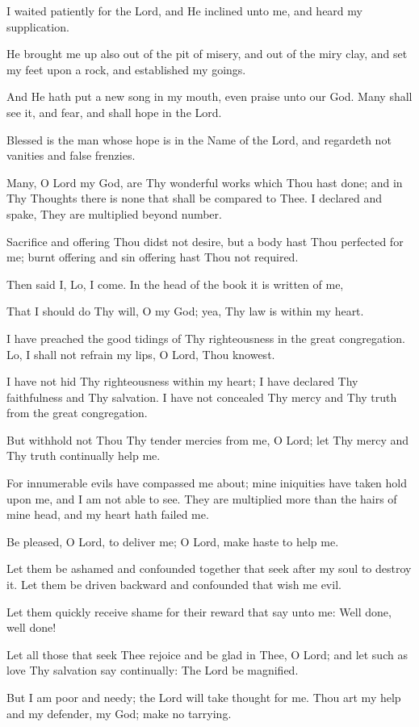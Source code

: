 I waited patiently for the Lord, and He inclined unto me, and heard my supplication.

He brought me up also out of the pit of misery, and out of the miry clay, and set my feet upon a rock, and established my goings.

And He hath put a new song in my mouth, even praise unto our God. Many shall see it, and fear, and shall hope in the Lord.

Blessed is the man whose hope is in the Name of the Lord, and regardeth not vanities and false frenzies.

Many, O Lord my God, are Thy wonderful works which Thou hast done; and in Thy Thoughts there is none that shall be compared to Thee. I declared and spake, They are multiplied beyond number.

Sacrifice and offering Thou didst not desire, but a body hast Thou perfected for me; burnt offering and sin offering hast Thou not required.

Then said I, Lo, I come. In the head of the book it is written of me,

That I should do Thy will, O my God; yea, Thy law is within my heart.

I have preached the good tidings of Thy righteousness in the great congregation. Lo, I shall not refrain my lips, O Lord, Thou knowest.

I have not hid Thy righteousness within my heart; I have declared Thy faithfulness and Thy salvation. I have not concealed Thy mercy and Thy truth from the great congregation.

But withhold not Thou Thy tender mercies from me, O Lord; let Thy mercy and Thy truth continually help me.

For innumerable evils have compassed me about; mine iniquities have taken hold upon me, and I am not able to see. They are multiplied more than the hairs of mine head, and my heart hath failed me.

Be pleased, O Lord, to deliver me; O Lord, make haste to help me.

Let them be ashamed and confounded together that seek after my soul to destroy it. Let them be driven backward and confounded that wish me evil.

Let them quickly receive shame for their reward that say unto me: Well done, well done!

Let all those that seek Thee rejoice and be glad in Thee, O Lord; and let such as love Thy salvation say continually: The Lord be magnified.

But I am poor and needy; the Lord will take thought for me. Thou art my help and my defender, my God; make no tarrying.
